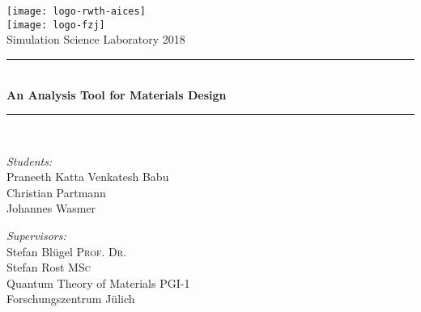 
\begin{titlepage}
    \begin{center}

        \texttt{[image: logo-rwth-aices]}\\[1cm]
        \texttt{[image: logo-fzj]}\\[1cm]


        {\large Simulation Science Laboratory 2018}\\[0.5cm]

        \rule{\linewidth}{0.5mm} \\[0.4cm]
        { \huge \bfseries An Analysis Tool for Materials Design \\[0.4cm] }
        \rule{\linewidth}{0.5mm} \\[1.5cm]

        \noindent
        \begin{minipage}{0.4\textwidth}
            \begin{flushleft} \large
                \emph{Students:}\\ \normalsize
                Praneeth Katta Venkatesh Babu\\
                Christian Partmann\\
                Johannes Wasmer\\
            \end{flushleft}
        \end{minipage}%
        \begin{minipage}{0.4\textwidth}
            \begin{flushright} \large
                \emph{Supervisors:} \\ \normalsize
                Stefan Blügel \textsc{Prof. Dr.}\\
                Stefan Rost \textsc{MSc}\\
                Quantum Theory of Materials PGI-1\\
                Forschungszentrum Jülich
            \end{flushright}
        \end{minipage}

        \vfill


    \end{center}
\end{titlepage}




